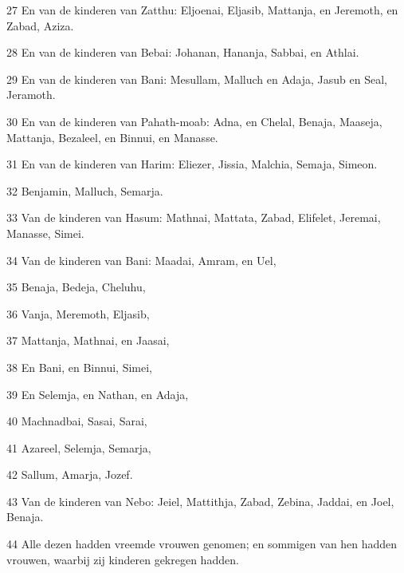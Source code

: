 \par 27 En van de kinderen van Zatthu: Eljoenai, Eljasib, Mattanja, en Jeremoth, en Zabad, Aziza.
\par 28 En van de kinderen van Bebai: Johanan, Hananja, Sabbai, en Athlai.
\par 29 En van de kinderen van Bani: Mesullam, Malluch en Adaja, Jasub en Seal, Jeramoth.
\par 30 En van de kinderen van Pahath-moab: Adna, en Chelal, Benaja, Maaseja, Mattanja, Bezaleel, en Binnui, en Manasse.
\par 31 En van de kinderen van Harim: Eliezer, Jissia, Malchia, Semaja, Simeon.
\par 32 Benjamin, Malluch, Semarja.
\par 33 Van de kinderen van Hasum: Mathnai, Mattata, Zabad, Elifelet, Jeremai, Manasse, Simei.
\par 34 Van de kinderen van Bani: Maadai, Amram, en Uel,
\par 35 Benaja, Bedeja, Cheluhu,
\par 36 Vanja, Meremoth, Eljasib,
\par 37 Mattanja, Mathnai, en Jaasai,
\par 38 En Bani, en Binnui, Simei,
\par 39 En Selemja, en Nathan, en Adaja,
\par 40 Machnadbai, Sasai, Sarai,
\par 41 Azareel, Selemja, Semarja,
\par 42 Sallum, Amarja, Jozef.
\par 43 Van de kinderen van Nebo: Jeiel, Mattithja, Zabad, Zebina, Jaddai, en Joel, Benaja.
\par 44 Alle dezen hadden vreemde vrouwen genomen; en sommigen van hen hadden vrouwen, waarbij zij kinderen gekregen hadden.



